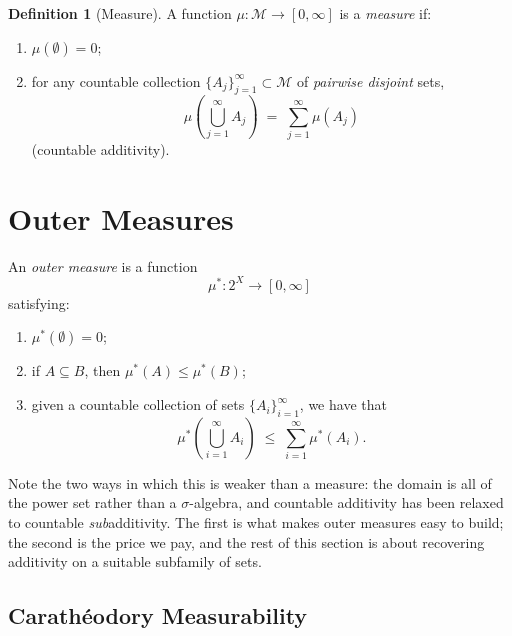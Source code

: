 \documentclass[11pt]{article}
\theoremstyle{definition}
\newtheorem{definition}{Definition}[section]
\theoremstyle{plain}
\newcommand{\M}{\mathcal{M}}
\newcommand{\ostar}{\mu^{*}}
\begin{document}
\begin{definition}[Measure]
A function $\mu : \M \to [0,\infty]$ is a \emph{measure} if:
\begin{enumerate}[label=\arabic*.]
  \item $\mu(\emptyset) = 0$;
  \item for any countable collection $\{A_j\}_{j=1}^{\infty} \subset \M$
        of \emph{pairwise disjoint} sets,
        \[
          \mu\left( \bigcup_{j=1}^{\infty} A_j \right)
            \;=\; \sum_{j=1}^{\infty} \mu(A_j)
        \]
        (countable additivity).
\end{enumerate}
\end{definition}

\section{Outer Measures}

An \emph{outer measure} is a function
\[
  \ostar : 2^{X} \longrightarrow [0,\infty]
\]
satisfying:
\begin{enumerate}[label=\arabic*.]
  \item $\ostar(\emptyset) = 0$;
  \item if $A \subseteq B$, then $\ostar(A) \le \ostar(B)$;
  \item given a countable collection of sets $\{A_i\}_{i=1}^{\infty}$,
        we have that
        \[
          \ostar\left( \bigcup_{i=1}^{\infty} A_i \right)
            \;\le\; \sum_{i=1}^{\infty} \ostar(A_i).
        \]
\end{enumerate}

Note the two ways in which this is weaker than a measure: the domain is
all of the power set rather than a $\sigma$-algebra, and countable
additivity has been relaxed to countable \emph{sub}additivity. The
first is what makes outer measures easy to build; the second is the
price we pay, and the rest of this section is about recovering
additivity on a suitable subfamily of sets.

\subsection{Carath\'eodory Measurability}
\end{document}

